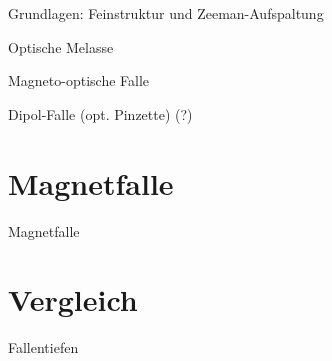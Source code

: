 \documentclass[12pt]{beamer}
\begin{document}
\begin{frame}{Grundlagen: Feinstruktur und Zeeman-Aufspaltung}
\end{frame}

\begin{frame}{Optische Melasse}
\end{frame}

\begin{frame}{Magneto-optische Falle}
\end{frame}

\begin{frame}{Dipol-Falle (opt. Pinzette) (?)}
\end{frame}


\section{Magnetfalle}

\begin{frame}{Magnetfalle}
\end{frame}


\section{Vergleich}

\begin{frame}{Fallentiefen}
\end{frame}
\end{document}
